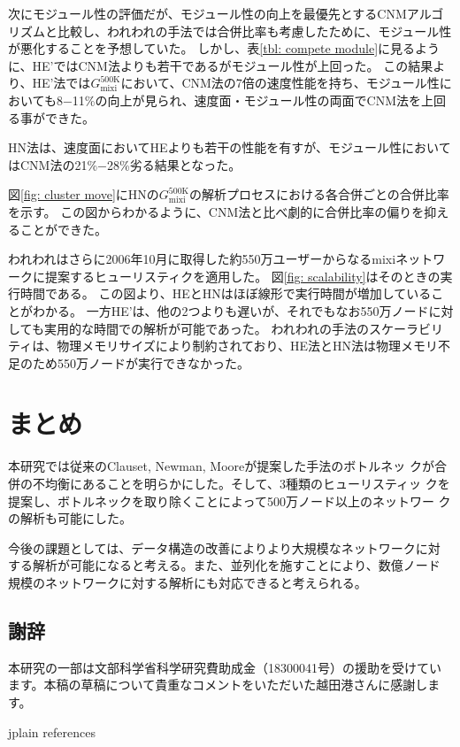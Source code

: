 \documentclass [a4j,11pt] {jsarticle}
\begin{document}
次にモジュール性の評価だが、モジュール性の向上を最優先とするCNMアルゴリズムと比較し、われわれの手法では合併比率も考慮したために、モジュール性が悪化することを予想していた。
しかし、表\ref{tbl: compete module}に見るように、HE'ではCNM法よりも若干であるがモジュール性が上回った。
この結果より、HE'法では$G_{\text{mixi}}^{\text{500K}}$において、CNM法の7倍の速度性能を持ち、モジュール性においても8−11\%の向上が見られ、速度面・モジュール性の両面でCNM法を上回る事ができた。

HN法は、速度面においてHEよりも若干の性能を有すが、モジュール性においてはCNM法の21\%−28\%劣る結果となった。

図\ref{fig: cluster move}にHNの$G_{\text{mixi}}^{\text{500K}}$の解析プロセスにおける各合併ごとの合併比率を示す。
この図からわかるように、CNM法と比べ劇的に合併比率の偏りを抑えることができた。

われわれはさらに2006年10月に取得した約550万ユーザーからなるmixiネットワークに提案するヒューリスティクを適用した。
図\ref{fig: scalability}はそのときの実行時間である。
この図より、HEとHNはほぼ線形で実行時間が増加していることがわかる。
一方HE'は、他の2つよりも遅いが、それでもなお550万ノードに対しても実用的な時間での解析が可能であった。
われわれの手法のスケーラビリティは、物理メモリサイズにより制約されており、HE法とHN法は物理メモリ不足のため550万ノードが実行できなかった。


\section {まとめ}
\label {sect: summary}

本研究では従来のClauset, Newman, Mooreが提案した手法のボトルネッ
クが合併の不均衡にあることを明らかにした。そして、3種類のヒューリスティッ
クを提案し、ボトルネックを取り除くことによって500万ノード以上のネットワー
クの解析も可能にした。

今後の課題としては、データ構造の改善によりより大規模なネットワークに対
する解析が可能になると考える。また、並列化を施すことにより、数億ノード
規模のネットワークに対する解析にも対応できると考えられる。

\subsection*{謝辞}

本研究の一部は文部科学省科学研究費助成金（18300041号）の援助を受けてい
ます。本稿の草稿について貴重なコメントをいただいた越田港さんに感謝しま
す。


 {jplain} %
 {references}
\end{document}
